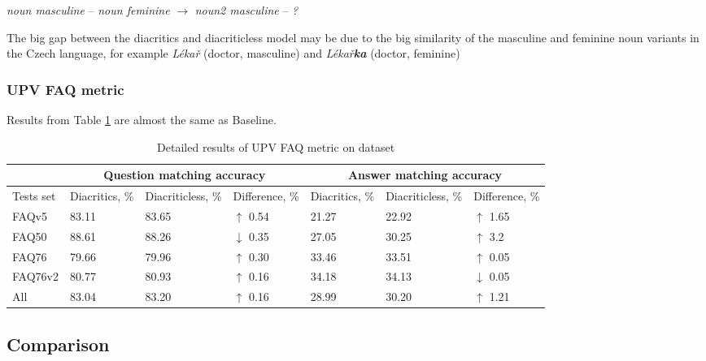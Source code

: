 \documentclass{article}
\begin{document}
\centerline{ \textit{noun masculine} -- \textit{noun feminine} $\rightarrow$ \textit{noun2 masculine} -- \textit{?} }

The big gap between the diacritics and diacriticless model may be due to the big similarity of the masculine and feminine noun variants in the Czech language, for example \textit{Lékař} (doctor, masculine) and \textit{Lékař\textbf{ka}} (doctor, feminine)

\subsubsection{UPV FAQ metric}

Results from Table \ref{UPV_FAQ_detailed} are almost the same as Baseline.

\begin{table}[h]
  \centering
  \begin{tabular}{ |p{1.9cm}||p{2cm}|p{2.4cm}|p{2.1cm}||p{2.1cm}|p{2.4cm}|p{2.1cm}|  }
    \hline
    \multirow{1}{*}{} & \multicolumn{3}{c||}{Question matching accuracy} & \multicolumn{3}{c|}{Answer matching accuracy} \\
    \hline
    \hline
    Tests set & Diacritics, \% & Diacriticless, \% & Difference, \%    & Diacritics, \% & Diacriticless, \% & Difference, \%    \\
    \hline
    FAQv5     & 83.11          & 83.65             & $\uparrow$ 0.54   & 21.27          & 22.92             & $\uparrow$ 1.65   \\
    FAQ50     & 88.61          & 88.26             & $\downarrow$ 0.35 & 27.05          & 30.25             & $\uparrow$ 3.2    \\
    FAQ76     & 79.66          & 79.96             & $\uparrow$ 0.30   & 33.46          & 33.51             & $\uparrow$ 0.05   \\
    FAQ76v2   & 80.77          & 80.93             & $\uparrow$ 0.16   & 34.18          & 34.13             & $\downarrow$ 0.05 \\
    \hline
    All       & 83.04          & 83.20             & $\uparrow$ 0.16   & 28.99          & 30.20             & $\uparrow$ 1.21   \\
    \hline
  \end{tabular}
  \caption{Detailed results of UPV FAQ metric on dataset}
  \label{UPV_FAQ_detailed}
\end{table}

\subsection{Comparison}
\end{document}
